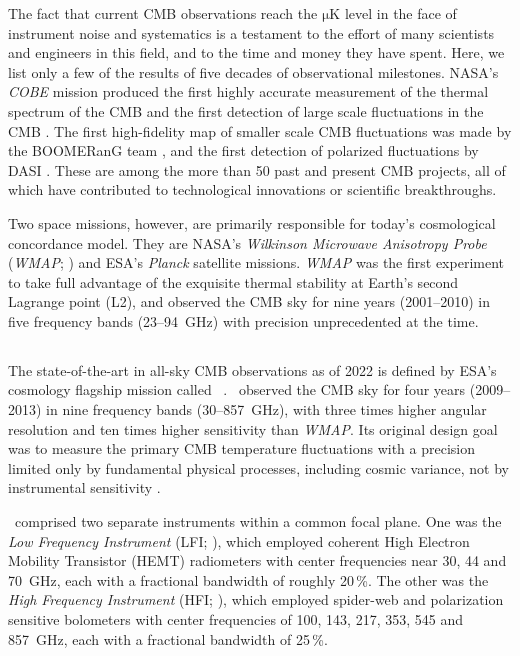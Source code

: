 \documentclass[twocolumn]{aa}
\def\WMAP{\emph{WMAP}}
\begin{document}
The fact that current CMB observations reach the $\mathrm{\mu K}$ level in the
face of instrument noise and systematics is a testament to the effort
of many scientists and engineers in this field, and to the time and
money they have spent.  Here, we list only a few of the results of
five decades of observational milestones.  NASA's \emph{COBE} mission
produced the first highly accurate measurement of the thermal spectrum
of the CMB \citep{mather:1994} and the first detection of large scale
fluctuations in the CMB \citep{smoot:1992}. The first high-fidelity
map of smaller scale CMB fluctuations was made by the BOOMERanG team
\citep{debernardis:2000}, and the first detection of polarized
fluctuations by DASI \citep{kovac:2002}.  These are among the more
than 50 past and present CMB projects, all of which have contributed to
technological innovations or scientific breakthroughs.

Two space missions, however, are primarily responsible for today's 
cosmological concordance model. They are NASA's \emph{Wilkinson Microwave
 Anisotropy Probe} (\WMAP; \citealp{bennett2012}) and ESA's
\emph{Planck} \citep{planck2016-l01} satellite missions. \emph{WMAP}
was the first experiment to take full advantage of the exquisite
thermal stability at Earth's second Lagrange point (L2), and observed
the CMB sky for nine years (2001--2010) in five frequency bands
(23--94~GHz) with precision unprecedented at the time. 

\subsection{\Planck}

The state-of-the-art in all-sky CMB observations as of 2022 is defined
by ESA's cosmology flagship mission called
\Planck\ \citep{planck2016-l01}. \Planck\ observed the CMB sky for
four years (2009--2013) in nine frequency bands (30--857~GHz), with
three times higher angular resolution and ten times higher sensitivity
than \WMAP. Its original design goal was to measure the primary CMB
temperature fluctuations with a precision limited only by fundamental
physical processes, including cosmic variance, not by instrumental
sensitivity \citep{planck2005-bluebook}.

\Planck\ comprised two separate instruments within a common focal plane. One was 
the \emph{Low Frequency Instrument} (LFI; \citealp{planck2016-l02}),
which employed coherent High Electron Mobility Transistor (HEMT)
radiometers with center frequencies near 30, 44 and 70~GHz,
 each with a fractional bandwidth of roughly 20\,\%. The other
was the \emph{High Frequency Instrument} (HFI;
\citealp{planck2016-l03}), which employed spider-web and polarization
sensitive bolometers with center frequencies of 100, 143, 217, 353,
545 and 857~GHz, each with a fractional bandwidth of 25\,\%.
\end{document}
